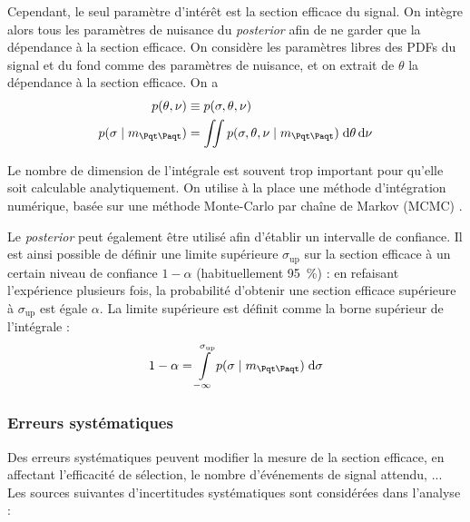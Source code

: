 Cependant, le seul paramètre d'intérêt est la section efficace du signal. On intègre alors tous les paramètres de nuisance du \emph{posterior} afin de ne garder que la dépendance à la section efficace. On considère les paramètres libres des PDFs du signal et du fond comme des paramètres de nuisance, et on extrait de $\theta$ la dépendance à la section efficace. On a
\begin{align*}
  p(\theta, \nu) &\equiv p(\sigma, \theta, \nu) \\
  p(\sigma \mid \mtt) &= \iint{ p(\sigma, \theta, \nu \mid \mtt) \; \mathrm{d\theta} \, \mathrm{d} \nu }
\end{align*}

Le nombre de dimension de l'intégrale est souvent trop important pour qu'elle soit calculable analytiquement. On utilise à la place une méthode d'intégration numérique, basée sur une méthode Monte-Carlo par chaîne de Markov (MCMC) \citep{metropolis,hastings70}.

\smallskip

Le \emph{posterior} peut également être utilisé afin d'établir un intervalle de confiance. Il est ainsi possible de définir une limite supérieure $\sigma_\text{up}$ sur la section efficace à un certain niveau de confiance $1 - \alpha$ (habituellement \SI{95}{\percent}) : en refaisant l'expérience plusieurs fois, la probabilité d'obtenir une section efficace supérieure à $\sigma_\text{up}$ est égale $ \alpha$.
La limite supérieure est définit comme la borne supérieur de l'intégrale :
\begin{align*}
  1 - \alpha = \int \limits_{-\infty}^{\sigma_{\text{up}}} p(\sigma \mid \mtt) \; \mathrm{d} \sigma
\end{align*}

\subsubsection{Erreurs systématiques}

Des erreurs systématiques peuvent modifier la mesure de la section efficace, en affectant l'efficacité de sélection, le nombre d'événements de signal attendu, ... Les sources suivantes d'incertitudes systématiques sont considérées dans l'analyse :

